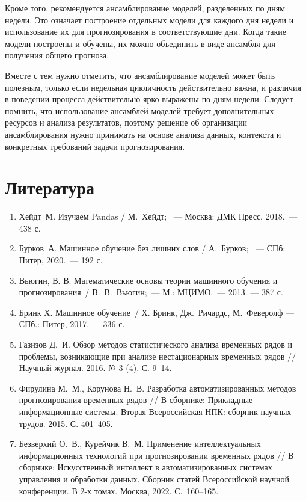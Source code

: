 \documentclass[a4paper,12pt]{article}
\begin{document}
Кроме того, рекомендуется ансамблирование моделей, разделенных по дням недели. Это означает построение отдельных модели для каждого дня недели и использование их для прогнозирования в соответствующие дни. Когда такие модели построены и обучены, их можно объединить в виде ансамбля для получения общего прогноза.

Вместе с тем нужно отметить, что ансамблирование моделей может быть полезным, только если недельная цикличность действительно важна, и различия в поведении процесса действительно ярко выражены по дням недели. Следует помнить, что использование ансамблей моделей требует дополнительных ресурсов и анализа результатов, поэтому решение об организации ансамблирования нужно принимать на основе анализа данных, контекста и конкретных требований задачи прогнозирования.


\section{Литература}
\begin{enumerate}
	\item Хейдт М. Изучаем Pandas / М. Хейдт;  — Москва: ДМК Пресс, 2018. — 438 с.
	\item Бурков А. Машинное обучение без лишних слов / А. Бурков;  — СПб: Питер, 2020. — 192 с.
	\item Вьюгин, В. В. Математические основы теории машинного обучения и прогнозирования / В. В. Вьюгин; — М.: МЦИМО. — 2013. — 387 с. 
	\item Бринк Х. Машинное обучение / Х. Бринк, Дж. Ричардс, М. Феверолф  — СПб.: Питер, 2017. — 336 с.
	\item Газизов Д. И. Обзор методов статистического анализа временных рядов и проблемы, возникающие при анализе нестационарных временных рядов // Научный журнал. 2016. № 3 (4). С. 9--14.
	\item Фирулина М. М., Корунова Н. В. Разработка автоматизированных методов прогнозирования временных рядов // В сборнике: Прикладные информационные системы. Вторая Всероссийская НПК: сборник научных трудов. 2015. С. 401--405.
	\item Безверхий О. В., Курейчик В. М. Применение интеллектуальных информационных технологий при прогнозировании временных рядов // В сборнике: Искусственный интеллект в автоматизированных системах управления и обработки данных. Сборник статей Всероссийской научной конференции. В 2-х томах. Москва, 2022. С. 160--165.
\end{enumerate}
\end{document}
